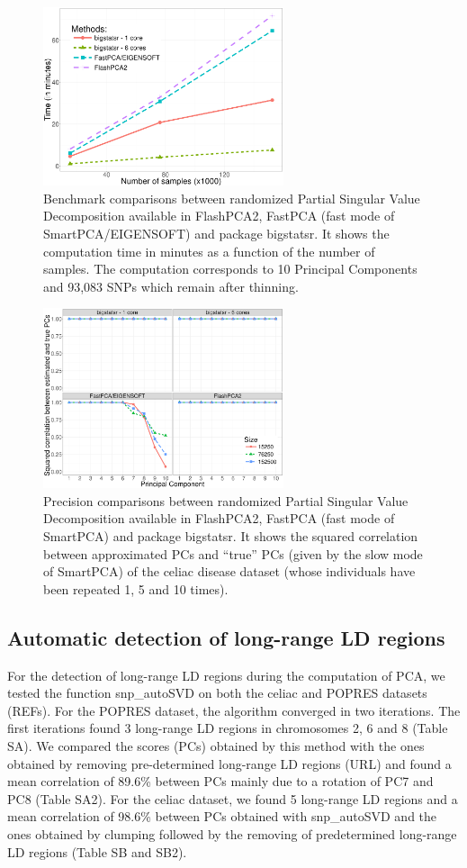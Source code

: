 \documentclass{bioinfo}
\begin{document}
\begin{figure}[!tpb]
\centerline{\includegraphics[width=200pt]{benchmark-pca}}
\caption{Benchmark comparisons between randomized Partial Singular Value Decomposition available in FlashPCA2, FastPCA (fast mode of SmartPCA/EIGENSOFT) and package bigstatsr. It shows the computation time in minutes as a function of the number of samples. The computation corresponds to 10 Principal Components and 93,083 SNPs which remain after thinning.}\label{fig:bench-pca}
\end{figure}

\begin{figure}[!tpb]
\centerline{\includegraphics[width=200pt]{precision-pca}}
\caption{Precision comparisons between randomized Partial Singular Value Decomposition available in FlashPCA2, FastPCA (fast mode of SmartPCA) and package bigstatsr. It shows the squared correlation between approximated PCs and ``true'' PCs (given by the slow mode of SmartPCA) of the celiac disease dataset (whose individuals have been repeated 1, 5 and 10 times).}\label{fig:prec-pca}
\end{figure}

\subsection{Automatic detection of long-range LD regions}

For the detection of long-range LD regions during the computation of PCA, we tested the function snp\_autoSVD on both the celiac and POPRES datasets (REFs). For the POPRES dataset, the algorithm converged in two iterations. The first iterations found 3 long-range LD regions in chromosomes 2, 6 and 8 (Table SA). We compared the scores (PCs) obtained by this method with the ones obtained by removing pre-determined long-range LD regions (URL) and found a mean correlation of 89.6\% between PCs mainly due to a rotation of PC7 and PC8 (Table SA2). For the celiac dataset, we found 5 long-range LD regions and a mean correlation of 98.6\% between PCs obtained with snp\_autoSVD and the ones obtained by clumping followed by the removing of predetermined long-range LD regions (Table SB and SB2).
\end{document}
